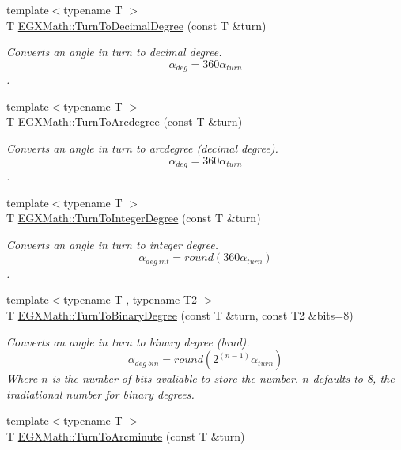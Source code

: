 \begin{DoxyCompactItemize}
{\footnotesize template$<$typename T $>$ }\\T \mbox{\hyperlink{group___e_g_x_math-_angle_conversions-_turn_ga79231536255e77fb7a158b99a30c1767}{E\+G\+X\+Math\+::\+Turn\+To\+Decimal\+Degree}} (const T \&turn)
\begin{DoxyCompactList}\small\item\em Converts an angle in turn to decimal degree. \[\alpha_{deg}=360\alpha_{turn}\]. \end{DoxyCompactList}\item 
{\footnotesize template$<$typename T $>$ }\\T \mbox{\hyperlink{group___e_g_x_math-_angle_conversions-_turn_ga7bdc3a81ce316dd47b1a3179489fa195}{E\+G\+X\+Math\+::\+Turn\+To\+Arcdegree}} (const T \&turn)
\begin{DoxyCompactList}\small\item\em Converts an angle in turn to arcdegree (decimal degree). \[\alpha_{deg}=360\alpha_{turn}\]. \end{DoxyCompactList}\item 
{\footnotesize template$<$typename T $>$ }\\T \mbox{\hyperlink{group___e_g_x_math-_angle_conversions-_turn_ga999085c62490997da870618e20e88ebb}{E\+G\+X\+Math\+::\+Turn\+To\+Integer\+Degree}} (const T \&turn)
\begin{DoxyCompactList}\small\item\em Converts an angle in turn to integer degree. \[\alpha_{deg\ int}=round(360\alpha_{turn})\]. \end{DoxyCompactList}\item 
{\footnotesize template$<$typename T , typename T2 $>$ }\\T \mbox{\hyperlink{group___e_g_x_math-_angle_conversions-_turn_ga678efb8f5c3958351fc3f1dfaf117b28}{E\+G\+X\+Math\+::\+Turn\+To\+Binary\+Degree}} (const T \&turn, const T2 \&bits=8)
\begin{DoxyCompactList}\small\item\em Converts an angle in turn to binary degree (brad). \[\alpha_{deg\ bin}=round(2^{(n-1)}\alpha_{turn})\] Where $n$ is the number of bits avaliable to store the number. $n$ defaults to 8, the tradiational number for binary degrees. \end{DoxyCompactList}\item 
{\footnotesize template$<$typename T $>$ }\\T \mbox{\hyperlink{group___e_g_x_math-_angle_conversions-_turn_ga72cda928d9043c7d82097b1a7920769e}{E\+G\+X\+Math\+::\+Turn\+To\+Arcminute}} (const T \&turn)

\end{DoxyCompactItemize}
